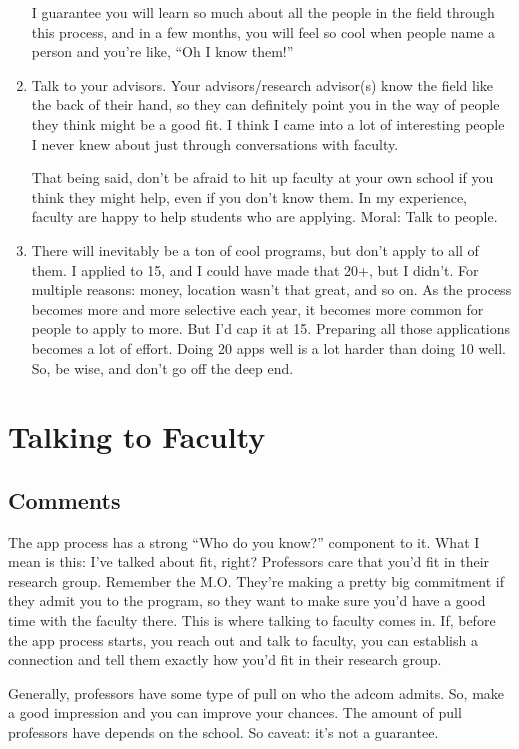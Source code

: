 \documentclass[12pt]{article}
\begin{document}
\begin{enumerate}
	I guarantee you will learn so much about all the people in the field through this process, and in a few months, you will feel so cool when people name a person and you're like, ``Oh I know them!''

	\item Talk to your advisors. Your advisors/research advisor(s) know the field like the back of their hand, so they can definitely point you in the way of people they think might be a good fit. I think I came into a lot of interesting people I never knew about just through conversations with faculty. 

	That being said, don't be afraid to hit up faculty at your own school if you think they might help, even if you don't know them. In my experience, faculty are happy to help students who are applying. Moral: Talk to people.

	\item There will inevitably be a ton of cool programs, but don't apply to all of them. I applied to 15, and I could have made that 20+, but I didn't. For multiple reasons: money, location wasn't that great, and so on. As the process becomes more and more selective each year, it becomes more common for people to apply to more. But I'd cap it at 15. Preparing all those applications becomes a lot of effort. Doing 20 apps well is a lot harder than doing 10 well. So, be wise, and don't go off the deep end.

\end{enumerate}

\section{Talking to Faculty}

\subsection{Comments}
The app process has a strong ``Who do you know?'' component to it. What I mean is this: I've talked about fit, right? Professors care that you'd fit in their research group. Remember the M.O. They're making a pretty big commitment if they admit you to the program, so they want to make sure you'd have a good time with the faculty there. This is where talking to faculty comes in. If, before the app process starts, you reach out and talk to faculty, you can establish a connection and tell them exactly how you'd fit in their research group. 

Generally, professors have some type of pull on who the adcom admits. So, make a good impression and you can improve your chances. The amount of pull professors have depends on the school. So caveat: it's not a guarantee.
\end{document}
